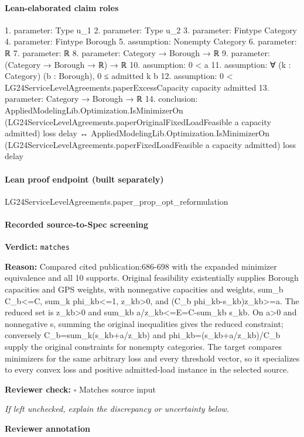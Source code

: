 \documentclass[10pt]{article}
\newcommand{\reviewerbox}{%
  \par\noindent\fbox{\parbox{0.96\linewidth}{\rule{0pt}{0.38in}}}\par
}
\newcommand{\reviewmatch}[1]{%
  \par\noindent\textbf{Reviewer check:} $\square$\; #1\par
  \noindent\emph{If left unchecked, explain the discrepancy or uncertainty below.}\par
}
\begin{document}
\paragraph{Lean-elaborated claim roles}\begin{ReviewVerbatim}
1. parameter: Type u_1
2. parameter: Type u_2
3. parameter: Fintype Category
4. parameter: Fintype Borough
5. assumption: Nonempty Category
6. parameter: ℝ
7. parameter: ℝ
8. parameter: Category → Borough → ℝ
9. parameter: (Category → Borough → ℝ) → ℝ
10. assumption: 0 < a
11. assumption: ∀ (k : Category) (b : Borough), 0 ≤ admitted k b
12. assumption: 0 < LG24ServiceLevelAgreements.paperExcessCapacity capacity admitted
13. parameter: Category → Borough → ℝ
14. conclusion: AppliedModelingLib.Optimization.IsMinimizerOn
    (LG24ServiceLevelAgreements.paperOriginalFixedLoadFeasible a capacity admitted) loss delay ↔
  AppliedModelingLib.Optimization.IsMinimizerOn (LG24ServiceLevelAgreements.paperFixedLoadFeasible a capacity admitted)
    loss delay
\end{ReviewVerbatim}

\paragraph{Lean proof endpoint (built separately)}\begin{ReviewVerbatim}
LG24ServiceLevelAgreements.paper_prop_opt_reformulation
\end{ReviewVerbatim}

\paragraph{Recorded source-to-Spec screening}
\textbf{Verdict:} \texttt{matches}
\\
{\raggedright
\textbf{Reason:} Compared cited publication:\allowbreak{}686-\allowbreak{}698 with the expanded minimizer equivalence and all 10 supports.\allowbreak{} Original feasibility existentially supplies Borough capacities and GPS weights, with nonnegative capacities and weights, sum\_\allowbreak{}b C\_\allowbreak{}b<=C, sum\_\allowbreak{}k phi\_\allowbreak{}kb<=1, z\_\allowbreak{}kb>0, and (C\_\allowbreak{}b phi\_\allowbreak{}kb-\allowbreak{}s\_\allowbreak{}kb)z\_\allowbreak{}kb>=a.\allowbreak{} The reduced set is z\_\allowbreak{}kb>0 and sum\_\allowbreak{}kb a/\allowbreak{}z\_\allowbreak{}kb<=E=C-\allowbreak{}sum\_\allowbreak{}kb s\_\allowbreak{}kb.\allowbreak{} On a>0 and nonnegative s, summing the original inequalities gives the reduced constraint;\allowbreak{} conversely C\_\allowbreak{}b=sum\_\allowbreak{}k(s\_\allowbreak{}kb+a/\allowbreak{}z\_\allowbreak{}kb) and phi\_\allowbreak{}kb=(s\_\allowbreak{}kb+a/\allowbreak{}z\_\allowbreak{}kb)/\allowbreak{}C\_\allowbreak{}b supply the original constraints for nonempty categories.\allowbreak{} The target compares minimizers for the same arbitrary loss and every threshold vector, so it specializes to every convex loss and positive admitted-\allowbreak{}load instance in the selected source.\allowbreak{}
\par}
\reviewmatch{Matches source input}
\noindent\textbf{Reviewer annotation}\par
\reviewerbox
\clearpage
\hypertarget{source-claim-86f5263c2da4bdd9}{}
\end{document}
